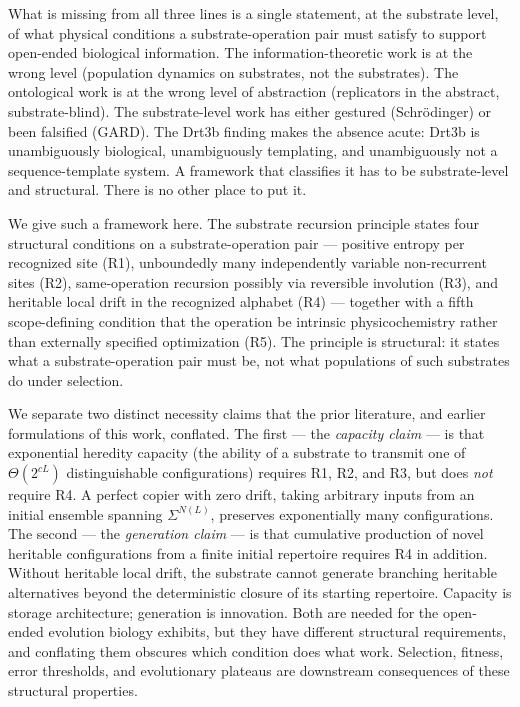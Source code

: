\documentclass[aps,prx,reprint,amsmath,amssymb,floatfix,superscriptaddress,nofootinbib]{revtex4-2}
\theoremstyle{plain-thm}
\theoremstyle{definition-thm}
\begin{document}
What is missing from all three lines is a single statement, at the substrate level, of what physical conditions a substrate-operation pair must satisfy to support open-ended biological information. The information-theoretic work is at the wrong level (population dynamics on substrates, not the substrates). The ontological work is at the wrong level of abstraction (replicators in the abstract, substrate-blind). The substrate-level work has either gestured (Schr\"odinger) or been falsified (GARD). The Drt3b finding makes the absence acute: Drt3b is unambiguously biological, unambiguously templating, and unambiguously not a sequence-template system. A framework that classifies it has to be substrate-level and structural. There is no other place to put it.

We give such a framework here. The substrate recursion principle states four structural conditions on a substrate-operation pair --- positive entropy per recognized site (R1), unboundedly many independently variable non-recurrent sites (R2), same-operation recursion possibly via reversible involution (R3), and heritable local drift in the recognized alphabet (R4) --- together with a fifth scope-defining condition that the operation be intrinsic physicochemistry rather than externally specified optimization (R5). The principle is structural: it states what a substrate-operation pair must be, not what populations of such substrates do under selection.

We separate two distinct necessity claims that the prior literature, and earlier formulations of this work, conflated. The first --- the \emph{capacity claim} --- is that exponential heredity capacity (the ability of a substrate to transmit one of $\Theta(2^{cL})$ distinguishable configurations) requires R1, R2, and R3, but does \emph{not} require R4. A perfect copier with zero drift, taking arbitrary inputs from an initial ensemble spanning $\Sigma^{N(L)}$, preserves exponentially many configurations. The second --- the \emph{generation claim} --- is that cumulative production of novel heritable configurations from a finite initial repertoire requires R4 in addition. Without heritable local drift, the substrate cannot generate branching heritable alternatives beyond the deterministic closure of its starting repertoire. Capacity is storage architecture; generation is innovation. Both are needed for the open-ended evolution biology exhibits, but they have different structural requirements, and conflating them obscures which condition does what work. Selection, fitness, error thresholds, and evolutionary plateaus are downstream consequences of these structural properties.
\end{document}
